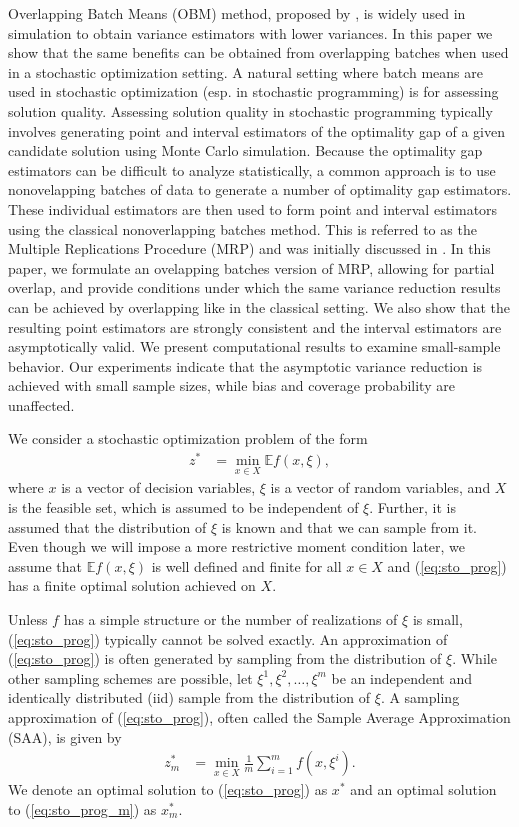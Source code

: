 \documentclass[12pt]{article}
\newcommand{\e}[1]{\mathbb{E} %
#1 %
}
\newcommand{\x}{x}
\newcommand{\xs}{\x^*}
\newcommand{\xit}{\xi}
\newcommand{\xiti}{\xit^i}
\begin{document}
Overlapping Batch Means (OBM) method, proposed by \citet{Meketon1984}, is widely used in simulation to obtain variance estimators with lower variances. 
In this paper we show that the same benefits can be obtained from overlapping batches when used in a stochastic optimization setting.  
A natural setting where batch means are used in stochastic optimization (esp. in stochastic programming) is for assessing solution quality. 
Assessing solution quality in stochastic programming typically involves generating point and interval estimators of the optimality gap of a given candidate solution using Monte Carlo simulation. 
Because the optimality gap estimators can be difficult to analyze statistically, a common approach is to use nonovelapping batches of data to generate a number of optimality gap estimators. 
These individual estimators are then used to form point and interval estimators using the classical nonoverlapping batches method.
This is referred to as the Multiple Replications Procedure (MRP) and was initially discussed in \citep{Mak1999}.   
In this paper, we formulate an ovelapping batches version of MRP, allowing for partial overlap, and provide conditions under which the same variance reduction results can be achieved by overlapping like in the classical setting. 
We also show that the resulting point estimators are strongly consistent and the interval estimators are asymptotically valid. 
We present computational results to examine small-sample behavior. 
Our experiments indicate that the asymptotic variance reduction is achieved with small sample sizes, while bias and coverage probability are unaffected.

We consider a stochastic optimization problem of the form 
\begin{align} \tag{SP} \label{eq:sto_prog} 
	z^* & = \min_{\x \in X} \e{f(\x,\xit)},
\end{align}
where $\x$ is a vector of decision variables, $\xit$ is a vector of random variables, and $X$ is the feasible set, which is assumed to be independent of $\xit$.
Further, it is assumed that the distribution of $\xit$ is known and that we can sample from it.
Even though we will impose a more restrictive moment condition later, we assume that $\e{f(\x,\xit)}$ is well defined and finite for all $\x \in X$ and (\ref{eq:sto_prog}) has a finite optimal solution achieved on $X$.


Unless $f$ has a simple structure or the number of realizations of $\xi$ is small, (\ref{eq:sto_prog}) typically cannot be solved exactly. 
An approximation of (\ref{eq:sto_prog}) is often generated by sampling from the distribution of $\xi$.
While other sampling schemes are possible, let $\xit^1, \xit^2, \dots, \xit^m$ be an independent and identically distributed (iid) sample from the distribution of $\xit$.
A sampling approximation of (\ref{eq:sto_prog}), often called the Sample Average Approximation (SAA), is given by
\begin{align} \tag{SP$_m$} \label{eq:sto_prog_m}
	z_m^* & = \min_{\x \in X} \frac{1}{m} \sum_{i=1}^m f(\x,\xiti).
\end{align}
We denote an optimal solution to (\ref{eq:sto_prog}) as $\xs$ and an optimal solution to (\ref{eq:sto_prog_m}) as $\xs_m$.
\end{document}

